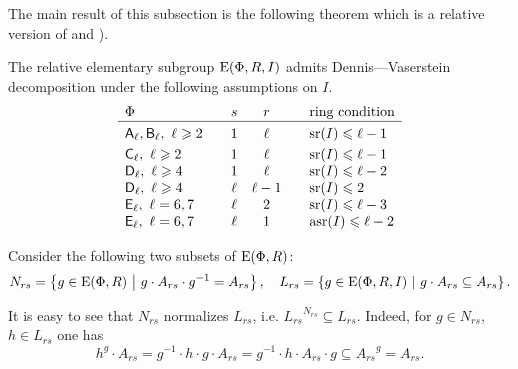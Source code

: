 The main result of this subsection is the following theorem which is a relative version of \cite[Lemma~2.1]{ST76} and \cite[Theorem~2.5]{St78}).
\begin{thm}\label{thm:DennisVaserstein}
The relative elementary subgroup $\operatorname{E}(\Phi, R, I)$ admits Dennis---Vaserstein decomposition under the following assumptions on $I$.
\[\begin{array}{l@{\qquad}c@{\quad}c@{\qquad}l}
\Phi & s & r & \text{ring condition} \\ \hline\vphantom{\Bigl(}
\rA_\ell, \rB_\ell,\ \ell\geqslant 2 & 1 & \ell & \sr(I) \leqslant \ell-1 \\     
\rC_\ell,\ \ell \geqslant 2          & 1 & \ell & \sr(I) \leqslant \ell-1 \\
\rD_\ell,\ \ell\geqslant 4           & 1 & \ell & \sr(I) \leqslant \ell-2 \\ 
\rD_\ell,\ \ell\geqslant 4           & \ell & \ell-1 & \sr(I) \leqslant 2 \\
\rE_\ell,\ \ell=6,7             & \ell & 2 & \sr(I) \leqslant \ell-3 \\ 
\rE_\ell,\ \ell=6,7             & \ell & 1 & \asr(I)\leqslant \ell-2
\end{array}\]
\end{thm}
Consider the following two subsets of $\operatorname{E}(\Phi, R)$:
\[ N_{rs} = \left\{ g\in \operatorname{E}(\Phi, R)\ \middle|\ g \cdot A_{rs} \cdot g^{-1} = A_{rs} \right\}, \quad
   L_{rs}=  \left\{ g\in \operatorname{E}(\Phi, R, I)\ \middle|\ g \cdot A_{rs} \subseteq A_{rs} \right\}. \]

It is easy to see that $N_{rs}$ normalizes $L_{rs}$, i.e. ${L_{rs}}^{N_{rs}} \subseteq L_{rs}$. 
Indeed, for $g\in N_{rs}$, $h\in L_{rs}$ one has
$$h^g \cdot A_{rs} = g^{-1} \cdot h \cdot g \cdot A_{rs} = g^{-1} \cdot h \cdot A_{rs} \cdot g \subseteq {A_{rs}}^g = A_{rs}.$$

